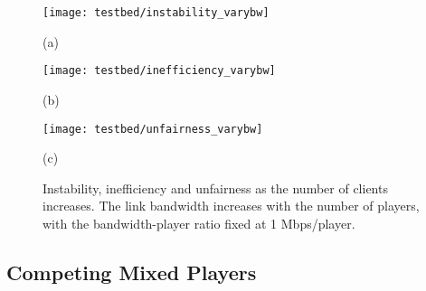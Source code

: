 \documentclass[conference]{IEEEtran}
\theoremstyle{plain}
\theoremstyle{definition}
\theoremstyle{plain}
\theoremstyle{plain}
\begin{document}
\begin{figure*}
\begin{centering}
\begin{minipage}[t]{0.66\columnwidth}\begin{center}
\texttt{[image: testbed/instability\_varybw]}
\par\end{center}

\begin{center}
\vspace{-0.1in}
(a) 
\par\end{center}\end{minipage} \begin{minipage}[t]{0.66\columnwidth}\begin{center}
\texttt{[image: testbed/inefficiency\_varybw]}
\par\end{center}

\begin{center}
\vspace{-0.1in}
(b) 
\par\end{center}\end{minipage} \begin{minipage}[t]{0.66\columnwidth}\begin{center}
\texttt{[image: testbed/unfairness\_varybw]}
\par\end{center}

\begin{center}
\vspace{-0.1in}
(c) 
\par\end{center}\end{minipage} 
\par\end{centering}

\vspace{-0.01in}

\caption{Instability, inefficiency and unfairness as the number of clients
increases. The link bandwidth increases with the number of players,
with the bandwidth-player ratio fixed at 1 Mbps/player.}


\label{Flo:varybw} \vspace{-0.05in}
\end{figure*}



\subsection{Competing Mixed Players}
\end{document}
